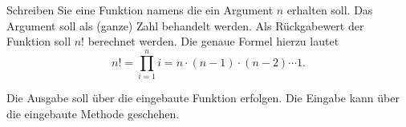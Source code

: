 %
\par Schreiben Sie eine Funktion namens  die ein Argument $n$
erhalten soll. Das Argument soll als (ganze) Zahl behandelt werden. Als
Rückgabewert der Funktion soll $n!$ berechnet werden. Die genaue Formel hierzu
lautet
%
\begin{equation}
n! = \prod_{i = 1}^n i = n \cdot (n - 1) \cdot (n - 2) \cdots 1.
\end{equation}
%
\par Die Ausgabe soll über die eingebaute Funktion  erfolgen. Die
Eingabe kann über die eingebaute Methode  geschehen.